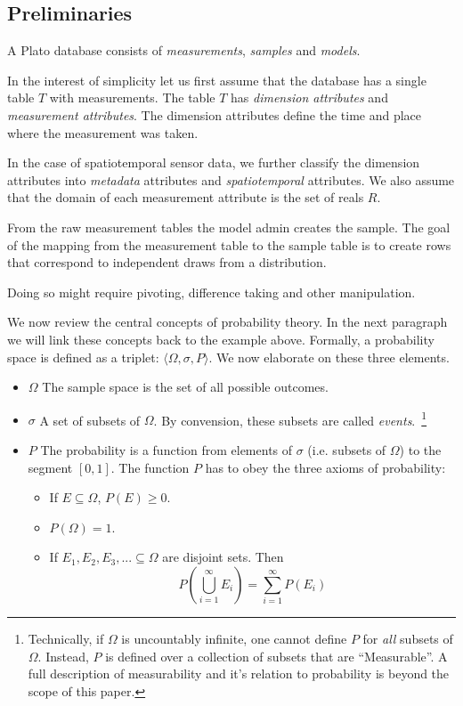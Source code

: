 \subsection{Preliminaries}
\label{sec:prelims}

A Plato database consists of {\em measurements}, {\em samples} and {\em models}.


 In the interest of
simplicity let us first assume that the database has a single table
$T$ with measurements. The table $T$ has {\em dimension attributes}
and {\em measurement attributes}. The dimension attributes define the
time and place where the measurement was taken.

In the case of spatiotemporal sensor data, we further classify the
dimension attributes into {\em metadata} attributes and {\em
  spatiotemporal} attributes. We also assume that the domain of each
measurement attribute is the set of reals $R$.


 From the raw measurement tables the model
admin creates the sample. The goal of the mapping from the measurement
table to the sample table is to create rows that correspond to
independent draws from a distribution.

Doing so might require pivoting, difference taking and other manipulation.

We now review the central concepts of probability theory. In the next
paragraph we will link these concepts back to the example above.
Formally, a probability space is defined as a triplet: $\langle
\Omega, \sigma, P  \rangle$. We now elaborate on these three elements.
\begin{itemize}
\item {\bf $\Omega$} The sample space is the set of all possible outcomes.
\item {\bf $\sigma$} A set of subsets of
  $\Omega$. By convension, these subsets are called {\em events}.~\footnote{Technically, if $\Omega$ is uncountably
  infinite, one cannot define $P$ for {\em all} subsets of
  $\Omega$. Instead, $P$ is defined over a collection of subsets that
  are ``Measurable''. A full description of measurability and it's
  relation to probability is beyond the scope of this paper.}
\item {\bf $P$} The probability is a function from elements of
  $\sigma$ (i.e. subsets of $\Omega$) to the segment $[0,1]$. The function $P$
  has to obey the three axioms of probability:
\begin{itemize}
\item If $E \subseteq \Omega$, $P(E) \geq 0$.  
\item $P(\Omega)=1$.
\item If $E_1,E_2,E_3,... \subseteq \Omega$ are disjoint sets. Then 
$$ P\left(\bigcup_{i=1}^{\infty} E_i \right)=\sum_{i=1}^{\infty}
  P(E_i) $$
\end{itemize}
\end{itemize}

